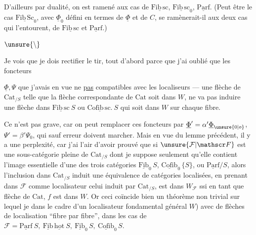 D'ailleurs par dualité, on est ramené aux  cas de $\underline{\mathrm{Fib}\,\mathrm{sc}}$, $\underline{\mathrm{Fib}\,\mathrm{sc}}_0$, $\underline{\mathrm{Parf}}$. (Peut être le cas $\underline{\mathrm{Fib}\,\mathrm{Sc}}_0$, avec $\underline{\Phi}_0$ défini en termes de $\underline{\Phi}$ et de $C$, se ramènerait-il aux deux cas qui l'entourent, de $\underline{\mathrm{Fib}\,\mathrm{sc}}$ et $\underline{\mathrm{Parf}}$.)

\centerline{$\unsure{\backslash}$}

Je vois que je dois rectifier le tir, tout d'abord parce que j'ai oublié que les foncteurs


$\underline{\Phi},\Psi$ que j'avais en vue ne   \uline{pas}  compatibles avec les localiseurs --- une flèche  de $\mathrm{Cat}_{/S}$  telle que la flèche correspondante de $\mathrm{Cat}$ soit dans $W$, ne va pas induire une flèche dans $\underline{\mathrm{Fib}\,\mathrm{sc}}\ S$ ou $\underline{\mathrm{Cofib}\,\mathrm{sc}.}\ S$ qui soit dans $W$ sur chaque fibre.

Ce n'est pas grave, car on peut  remplacer ces foncteurs par $\underline{\Phi}'=\alpha'\underline{\Phi}_{\unsure{0|o}}$, $\Psi'=\beta'\Psi_0$, qui sauf erreur doivent marcher. Mais en vue du lemme précédent, il y a une perplexité, car j'ai l'air d'avoir prouvé que si $\unsure{\mathcal F|\mathscr F}$ est une sous-catégorie pleine de $\mathrm{Cat}_{/S}$ \unsure{\{} dont je suppose seulement qu'elle contient  l'image essentielle d'une des trois catégories $\underline{\mathrm{Fib}}_0\,S$, $\underline{\mathrm{Cofib}}_0\,\{S\}$, ou $\underline{\mathrm{Parf}}/S$, alors l'inclusion dans $\mathrm{Cat}_{/S}$ induit une équivalence de catégories localisées, en prenant dans $\mathcal F$ comme localisateur celui induit par $\mathrm{Cat}_{/S}$, 
est dans $W_{\mathcal F}$ ssi en tant que flèche de $\mathrm{Cat}$, $f$ est dans $W$. Or ceci coïncide bien   un théorème non trivial sur lequel je   dans le cadre d'un localisateur fondamental général $W$) avec  de flèches de localisation ``fibre par fibre'', dans les cas de $\mathcal F=\underline{\mathrm{Parf}}\ S,\ \underline{\mathrm{Fib}}\,\underline{\mathrm{hot}}\ S,\ \underline{\mathrm{Fib}}_0\,S,\ \underline{\mathrm{Cofib}}_0\,S$.


